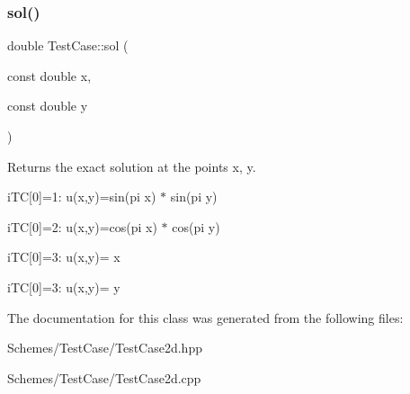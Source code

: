 \subsubsection{\texorpdfstring{sol()}{sol()}}
{\footnotesize\ttfamily double Test\+Case\+::sol (\begin{DoxyParamCaption}\item[{const double}]{x,  }\item[{const double}]{y }\end{DoxyParamCaption})}



Returns the exact solution at the points x, y. 

i\+TC\mbox{[}0\mbox{]}=1\+: u(x,y)=sin(pi x) $\ast$ sin(pi y)

i\+TC\mbox{[}0\mbox{]}=2\+: u(x,y)=cos(pi x) $\ast$ cos(pi y)

i\+TC\mbox{[}0\mbox{]}=3\+: u(x,y)= x

i\+TC\mbox{[}0\mbox{]}=3\+: u(x,y)= y 

The documentation for this class was generated from the following files\+:\begin{DoxyCompactItemize}
\item 
Schemes/\+Test\+Case/Test\+Case2d.\+hpp\item 
Schemes/\+Test\+Case/Test\+Case2d.\+cpp\end{DoxyCompactItemize}

